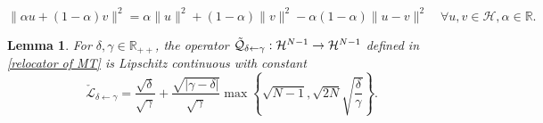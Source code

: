 \documentclass[10pt,a4paper]{amsart}
\newtheorem{lemma}{Lemma}
\begin{document}
\begin{equation} \label{eq:identity}
    \|\alpha u+(1-\alpha)v\|^2 = \alpha\|u\|^2+(1-\alpha)\|v\|^2-\alpha(1-\alpha)\|u-v\|^2\quad\forall u,v \in \mathcal{H}, \alpha \in \mathbb{R}.
\end{equation} 

\begin{lemma} \label{l:FPR-Lip}
    For $\delta,\gamma \in \mathbb{R}_{++}$, the operator $\mathcal{\Tilde{Q}}_{\delta\gets\gamma}: \mathcal{H}^{N-1} \to \mathcal{H}^{N-1}$ defined in \eqref{relocator of MT} is Lipschitz continuous with constant 
    \begin{equation*}
        \check{\mathcal{L}}_{\delta\gets\gamma} = \frac{\sqrt{\delta}}{\sqrt{\gamma}}+\frac{\sqrt{|\gamma-\delta|}}{\sqrt{\gamma}}\max\left\{\sqrt{N-1},  \sqrt{2N}\sqrt{\frac{\delta}{\gamma}}\right\}.
    \end{equation*}%
\end{lemma}
\end{document}
